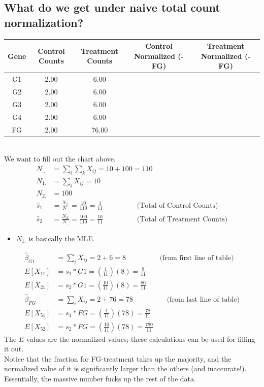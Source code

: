 \documentclass[10pt]{article}
\begin{document}
\subsection*{What do we get under naive total count normalization?}
\begin{tabular}{| c | c | c | c | c |}
    \hline
    Gene & Control Counts & Treatment Counts & Control Normalized (-FG) & Treatment Normalized (-FG) \\
    \hline
    G1 & 2.00 & 6.00 & & \\
    G2 & 2.00 & 6.00 & & \\
    G3 & 2.00 & 6.00 & & \\
    G4 & 2.00 & 6.00 & & \\
    FG & 2.00 & 76.00 & & \\
    \hline
\end{tabular}\\
We want to fill out the chart above.
\begin{align*}
N_{..} &= \sum_i \sum_k X_{ij} = 10 + 100 = 110\\
N_{1.} &= \sum_j X_{ij} = 10\\
N_{2.} &= 100\\
\hat s_1 &= \frac{N_{1.}}{N_{..}} = \frac{10}{110} = \frac{1}{11} \hspace{2cm} \text{(Total of Control Counts)}\\
\hat s_2 &= \frac{N_{2.}}{N_{..}} = \frac{100}{110} = \frac{10}{11} \hspace{2cm} \text{(Total of Treatment Counts)}
\end{align*}
\begin{itemize}
    \item $N_{1.}$ is basically the MLE.
\end{itemize}

\begin{align*}
    \hat \beta_{G1} &= \sum_i X_{ij} = 2 + 6 = 8\hspace{2cm} \text{(from first line of table)}\\
    E[X_{11}] &= s_1 * G1 = \left(\frac{1}{11}\right)(8) = \frac{8}{11}\\
    E[X_{21}] &= s_2 * G1 = \left(\frac{10}{11}\right)(8) = \frac{80}{11}\\
    \hat \beta_{FG} &= \sum_i X_{ij} = 2 + 76 = 78\hspace{2cm} \text{(from last line of table)}\\
    E[X_{51}] &= s_1 * FG = \left(\frac{1}{11}\right)(78) = \frac{78}{11}\\
    E[X_{52}] &= s_2 * FG = \left(\frac{10}{11}\right)(78) = \frac{780}{11}
\end{align*}
The $E$ values are the normalized values; these calculations can be used for filling it out.\\
Notice that the fraction for FG-treatment takes up the majority, and the normalized value of it is significantly larger than the others (and inaccurate!).  Essentially, the massive number fucks up the rest of the data.
\end{document}
